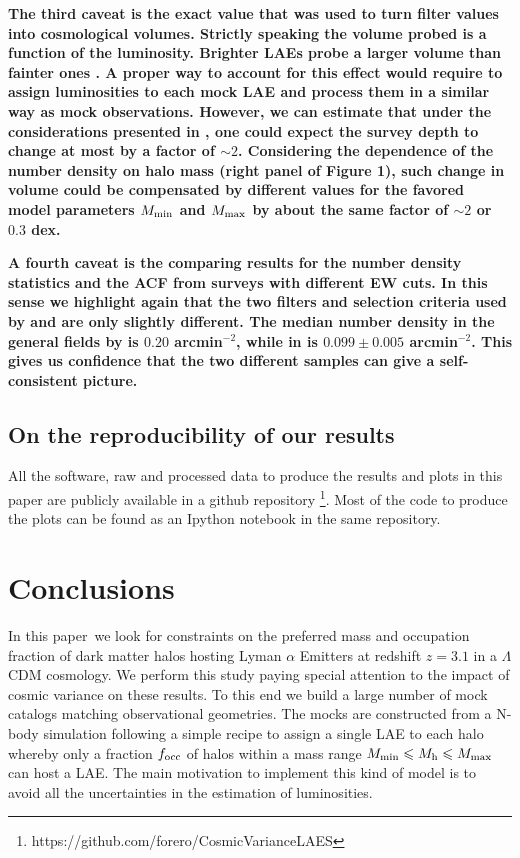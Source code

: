 \documentclass[usenatbib]{mn2e}
\newcommand{\documentname}{paper~}
\newcommand{\ly}{{\ifmmode{{\rm Ly}\alpha}\else{Ly$\alpha$~}\fi}}
\begin{document}
{\bf The third caveat is the exact value that was used to turn
  filter values into cosmological volumes. Strictly speaking the
  volume probed is a function of the \ly luminosity. Brighter LAEs
  probe a larger volume than fainter ones \citep{Gronwall07}. A proper
way to account for this effect would require to assign luminosities to
each mock LAE and process them in a similar way as mock
observations. However, we can estimate that under the considerations
presented in \citep{Gronwall07}, one could expect the survey depth to
change at most by a factor of $\sim2$. Considering the dependence
of the number density on halo mass (right panel of Figure 1), such
change in volume could be compensated by different values for the
favored model parameters $M_{\rm  min}$ and $M_{\rm max}$ by about the
same factor of $\sim2$ or $0.3$ dex. }

{\bf A fourth caveat is the comparing results for the number density
  statistics and the ACF from surveys with different EW cuts. In this
  sense we highlight again that the two filters and selection
  criteria used by \citep{Ouchi2008} and \citep{Yamada2012} are only
  slightly different. The median number density in the general fields by
  \citep{Yamada2012} is $0.20$ arcmin$^{-2}$, while in
  \citep{Ouchi2008} is $0.099\pm0.005$ arcmin$^{-2}$. This gives us
  confidence that the two different samples can give a self-consistent picture.}



\subsection{On the reproducibility of our results}

All the software, raw and processed data to produce the results
and plots in this paper are publicly available in a github
repository \footnote{https://github.com/forero/CosmicVarianceLAES}. Most
of the code to produce the plots can be found as an Ipython notebook
\citep{IPython} in the same repository.



\section{Conclusions}
\label{sec:conclusions}

In this \documentname we look for constraints on the preferred mass
and occupation fraction of dark matter halos hosting Lyman $\alpha$
Emitters at redshift $z=3.1$ in a $\Lambda$CDM cosmology. We perform
this study paying special attention to the impact of cosmic variance
on these results. To this end we build a large number of mock catalogs
matching observational geometries. The mocks are constructed from a
N-body simulation following a simple recipe to assign a single LAE to
each halo whereby only a fraction $f_{\rm occ}$ of halos within a mass
range  $M_{\rm min}\leq M_{\rm h}\leq M_{\rm   max}$ can host a
LAE. The main motivation to implement this kind of model is to avoid
all the uncertainties in the estimation of \ly luminosities. 
 
\end{document}
